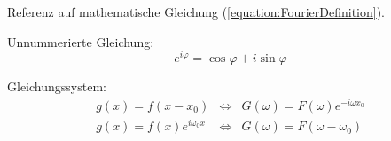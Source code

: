 Referenz auf mathematische Gleichung (\ref{equation:FourierDefinition}).

Unnummerierte Gleichung:
\begin{equation*}
	e^{i\varphi} = \cos\varphi + i \sin\varphi
\end{equation*}

Gleichungssystem:
\begin{eqnarray}
	g(x) = f(x - x_0) & \Leftrightarrow &
		G(\omega) = F(\omega) e^{-i\omega x_0} \\
	g(x) = f(x) e^{i\omega_0 x} & \Leftrightarrow &
		G(\omega) = F(\omega - \omega_0)
\end{eqnarray}
